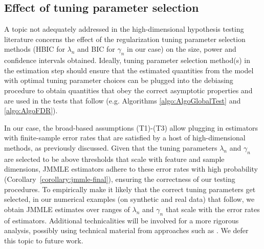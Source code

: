 \subsection{Effect of tuning parameter selection}
A topic not adequately addressed in the high-dimensional hypothesis testing literature concerns the effect of the regularization tuning parameter selection methods (HBIC for $\lambda_n$ and BIC for $\gamma_n$ in our case) on the size, power and confidence intervals obtained. Ideally, tuning parameter selection method(s) in the estimation step should ensure that the estimated quantities from the model with optimal tuning parameter choices can be plugged into the debiasing procedure to obtain quantities that obey the correct asymptotic properties and are used in the tests that follow (e.g. Algorithms \ref{algo:AlgoGlobalTest} and \ref{algo:AlgoFDR}).

In our case, the broad-based assumptions (T1)-(T3) allow plugging in estimators with finite-sample error rates that are satisfied by a host of high-dimensional methods, as previously discussed. Given that the tuning parameters $\lambda_n$ and $\gamma_n$ are selected to be above thresholds that scale with feature and sample dimensions, JMMLE estimators adhere to these error rates with high probability (Corollary~\ref{corollary:jmmle-final}), ensuring the correctness of our testing procedures. To empirically make it likely that the correct tuning parameters get selected, in our numerical examples (on synthetic and real data) that follow, we obtain JMMLE estimates over ranges of $\lambda_n$ and $\gamma_n$ that scale with the error rates of estimators. Additional technicalities will be involved for a more rigorous analysis, possibly using technical material from approaches such as \citet{FoygelDrton10,WangKimLi13}. We defer this topic to future work.

%

